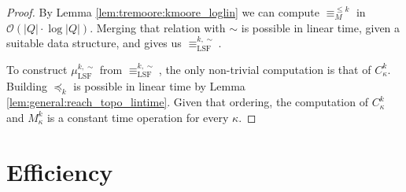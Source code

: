 \begin{proof}
	By Lemma \ref{lem:tremoore:kmoore_loglin} we can compute $\equiv_M^{\leq k}$ in $\mathcal{O}(|Q| \cdot \log |Q|)$. Merging that relation with $\sim$ is possible in linear time, given a suitable data structure, and gives us $\equiv_\text{LSF}^{k,\sim}$.
	
	To construct $\mu_\text{LSF}^{k,\sim}$ from $\equiv_\text{LSF}^{k,\sim}$, the only non-trivial computation is that of $C_\kappa^k$. Building $\preceq_k$ is possible in linear time by Lemma \ref{lem:general:reach_topo_lintime}. Given that ordering, the computation of $C_\kappa^k$ and $M_\kappa^k$ is a constant time operation for every $\kappa$.
\end{proof}


\section{Efficiency}












